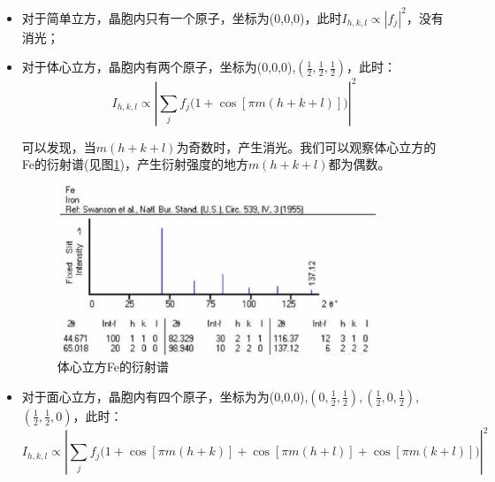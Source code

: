 \documentclass{ctexart}
\begin{document}
        \begin{itemize}
            \item 对于简单立方，晶胞内只有一个原子，坐标为(0,0,0)，此时$I_{h,k,l}\propto |f_j|^2$，没有消光；
            \item 对于体心立方，晶胞内有两个原子，坐标为(0,0,0),$(\frac{1}{2},\frac{1}{2},\frac{1}{2})$，此时：
            \begin{equation}
                I_{h,k,l}\propto |\sum_j f_j(1+\cos{[\pi m(h+k+l)])}|^2
            \end{equation}
            
            可以发现，当$m(h+k+l)$为奇数时，产生消光。我们可以观察体心立方的Fe的衍射谱(见图\ref{fig:bccFediffraction})，产生衍射强度的地方$m(h+k+l)$都为偶数。
            \begin{figure}[H]
                \centering
                \includegraphics[width=0.9\textwidth]{figure/铁的衍射谱.png}
                \caption{体心立方Fe的衍射谱}
                \label{fig:bccFediffraction}
            \end{figure}
            \item 对于面心立方，晶胞内有四个原子，坐标为为(0,0,0),$(0,\frac{1}{2},\frac{1}{2}),(\frac{1}{2},0,\frac{1}{2})$,$(\frac{1}{2},\frac{1}{2},0)$，此时：
            \begin{equation}
                I_{h,k,l}\propto |\sum_j f_j(1+\cos{[\pi m(h+k)]+\cos{[\pi m(h+l)]}+\cos{[\pi m(k+l)]})}|^2
            \end{equation}
            

\end{itemize}
\end{document}

